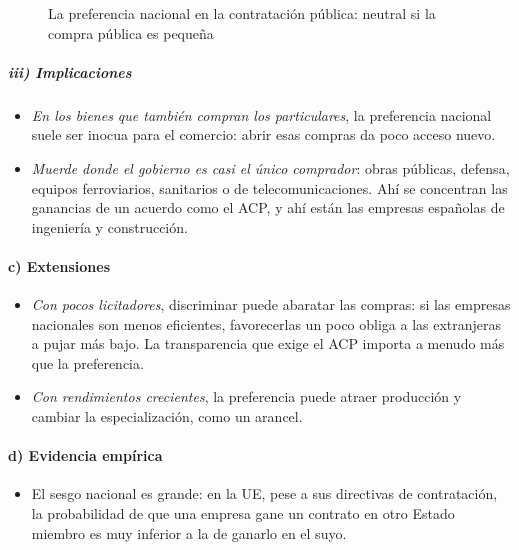 \documentclass[11pt]{article}
\begin{document}
\begin{figure}[H]
\centering
\caption{La preferencia nacional en la contratación pública: neutral si la compra pública es pequeña}\label{fig:sesgo}
\end{figure}

\subparagraph{iii) Implicaciones}

\begin{itemize}
\item \emph{En los bienes que también compran los particulares}, la preferencia nacional suele ser inocua para el comercio: abrir esas compras da poco acceso nuevo.
\item \emph{Muerde donde el gobierno es casi el único comprador}: obras públicas, defensa, equipos ferroviarios, sanitarios o de telecomunicaciones. Ahí se concentran las ganancias de un acuerdo como el ACP, y ahí están las empresas españolas de ingeniería y construcción.
\end{itemize}

\paragraph{c) Extensiones}

\begin{itemize}
\item \emph{Con pocos licitadores}, discriminar puede abaratar las compras: si las empresas nacionales son menos eficientes, favorecerlas un poco obliga a las extranjeras a pujar más bajo\nocite{McAfeeMcMillan1989Government}. La transparencia que exige el ACP importa a menudo más que la preferencia.
\item \emph{Con rendimientos crecientes}, la preferencia puede atraer producción y cambiar la especialización, como un arancel\nocite{Trionfetti2000Discriminatory}.
\end{itemize}

\paragraph{d) Evidencia empírica}

\begin{itemize}
\item El sesgo nacional es grande: en la UE, pese a sus directivas de contratación, la probabilidad de que una empresa gane un contrato en otro Estado miembro es muy inferior a la de ganarlo en el suyo\nocite{HerzVarelaIrimia2020Border}.
\end{itemize}
\end{document}
